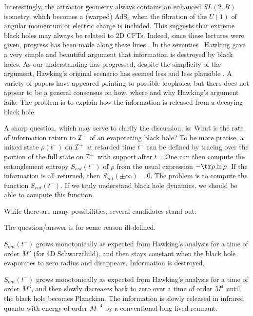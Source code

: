  Interestingly, the attractor geometry always contains an enhanced $SL(2,R)$ isometry, which becomes a (warped) AdS$_3$ when the fibration of the $U(1)$ of angular momentum or  electric charge is included.  This suggests that extreme black holes may  always be  related to 2D CFTs. Indeed, since these lectures were given, progress has been made along these lines \ghss. 
In the seventies \hinf\ Hawking gave a very simple and beautiful argument that 
information is destroyed by black holes. As our understanding has progressed, despite the simplicity of the argument, Hawking's original scenario has seemed less and less plausible \hnew. A variety of papers have appeared pointing to possible loopholes, but there does not appear to be a general consensus on how, where and why Hawking's  argument fails.  The problem is to explain how the information is released from a decaying black hole.

A sharp question, which may serve to clarify the discussion, is:  What is the rate of information return  to ${\cal I}^+$ of an evaporating black hole? To be more precise, a mixed state $\rho(t^-)$ on ${\cal I}^+$ at retarded time $t^-$ can be defined by tracing over 
the portion of the full state on ${\cal I}^+$ with support after $t^-$.  One can then compute the entanglement entropy $S_{ent}(t^-)$ of $\rho$ from the usual expression  $-\tr \rho \ln \rho$.  If the information is all returned, then $S_{ent}(\pm \infty)=0$. The problem is to compute the function $S_{ent}(t^-)$. If we truly understand black hole dynamics, we should be able to compute this function. 

While there are many possibilities, several candidates stand out:

 The question/answer is for some reason ill-defined.

 $ S_{ent}(t^-)$ grows monotonically as expected from Hawking's analysis for a time of order $M^3$ (for 4D Schwarzchild), and then stays constant when  the black hole evaporates to zero radius and disappears.  Information is destroyed. 

 $S_{ent}(t^-)$ grows monotonically as expected from Hawking's analysis for a time of order $M^3$, and then slowly decreases back to zero over a time of order $M^4$ until the black hole becomes Planckian. The information is slowly released in infrared quanta with energy of order $M^{-4}$  by a conventional long-lived remnant. 

